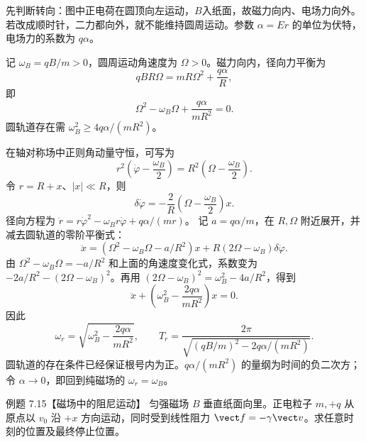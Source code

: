 \begin{xesolution}
先判断转向：图中正电荷在圆顶向左运动，$B$入纸面，故磁力向内、电场力向外。
若改成顺时针，二力都向外，就不能维持圆周运动。参数 $\alpha=Er$ 的单位为伏特，电场力的系数为 $q\alpha$。

记 $\omega_B=qB/m>0$，圆周运动角速度为 $\Omega>0$。磁力向内，径向力平衡为
\begin{equation}
  qBR\Omega=mR\Omega^2+\frac{q\alpha}R,
\end{equation}
即
\begin{equation}
  \Omega^2-\omega_B\Omega+\frac{q\alpha}{mR^2}=0.
\end{equation}
圆轨道存在需 $\omega_B^2\ge4q\alpha/(mR^2)$。

在轴对称场中正则角动量守恒，可写为
\begin{equation}
  r^2\left(\dot\varphi-\frac{\omega_B}{2}\right)
  =R^2\left(\Omega-\frac{\omega_B}{2}\right).
\end{equation}
令 $r=R+x$、$|x|\ll R$，则
\[
  \delta\dot\varphi=-\frac{2}{R}
  \left(\Omega-\frac{\omega_B}{2}\right)x.
\]
径向方程为 $\ddot r=r\dot\varphi^2-\omega_Br\dot\varphi+q\alpha/(mr)$。
记 $a=q\alpha/m$，在 $R,\Omega$ 附近展开，并减去圆轨道的零阶平衡式：
\[
 \ddot x=(\Omega^2-\omega_B\Omega-a/R^2)x
       +R(2\Omega-\omega_B)\delta\dot\varphi.
\]
由 $\Omega^2-\omega_B\Omega=-a/R^2$ 和上面的角速度变化式，系数变为
$-2a/R^2-(2\Omega-\omega_B)^2$。再用 $(2\Omega-\omega_B)^2=\omega_B^2-4a/R^2$，得到
\begin{equation}
  \ddot x+\left(\omega_B^2-\frac{2q\alpha}{mR^2}\right)x=0.
\end{equation}
因此
\begin{equation}
  \boxed{\omega_r=\sqrt{\omega_B^2-\frac{2q\alpha}{mR^2}}},
  \qquad
  \boxed{T_r=\frac{2\pi}{\sqrt{(qB/m)^2-2q\alpha/(mR^2)}}}.
\end{equation}
圆轨道的存在条件已经保证根号内为正。$q\alpha/(mR^2)$ 的量纲为时间的负二次方；
令 $\alpha\to0$，即回到纯磁场的 $\omega_r=\omega_B$。

\radialFieldOrbitDiagram
\end{xesolution}

\Needspace{0.44\textheight}
\begin{origexamplebox}{例题 7.15【磁场中的阻尼运动】}
匀强磁场 $B$ 垂直纸面向里。正电粒子 $m,+q$ 从原点以 $v_0$ 沿 $+x$ 方向运动，同时受到线性阻力
$\vect f=-\gamma\vect v$。求任意时刻的位置及最终停止位置。
\end{origexamplebox}

